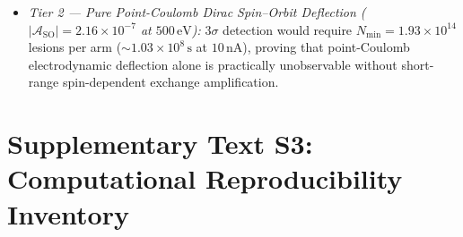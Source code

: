 \documentclass[10pt,letterpaper]{article}
\begin{document}
\begin{enumerate}
\begin{itemize}
        \item \emph{Tier 2 --- Pure Point-Coulomb Dirac Spin--Orbit Deflection ($|\mathcal{A}_{\mathrm{SO}}| = 2.16 \times 10^{-7}$ at $500\,\mathrm{eV}$):} $3\sigma$ detection would require $N_{\min} = 1.93 \times 10^{14}$ lesions per arm ($\sim 1.03 \times 10^8\,\mathrm{s}$ at $10\,\mathrm{nA}$), proving that point-Coulomb electrodynamic deflection alone is practically unobservable without short-range spin-dependent exchange amplification.
    \end{itemize}
\end{enumerate}

\section*{Supplementary Text S3: Computational Reproducibility Inventory}
\end{document}
